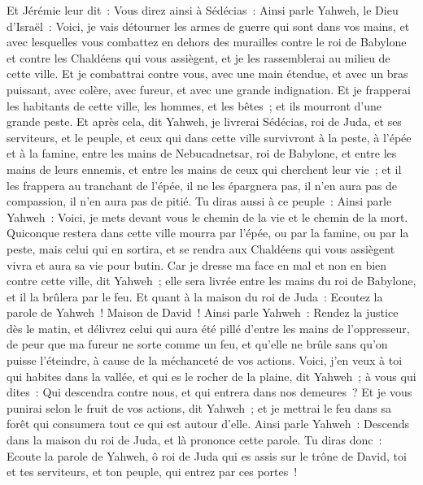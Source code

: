 \begin{multicols}{2}
Et Jérémie leur dit~: Vous direz ainsi à Sédécias~:
Ainsi parle Yahweh, le Dieu d'Israël~: Voici, je vais détourner les armes de guerre qui sont dans vos mains, et avec lesquelles vous combattez en dehors des murailles contre le roi de Babylone et contre les Chaldéens qui vous assiègent, et je les rassemblerai au milieu de cette ville.
Et je combattrai contre vous, avec une main étendue, et avec un bras puissant, avec colère, avec fureur, et avec une grande indignation.
Et je frapperai les habitants de cette ville, les hommes, et les bêtes~; et ils mourront d'une grande peste.
Et après cela, dit Yahweh, je livrerai Sédécias, roi de Juda, et ses serviteurs, et le peuple, et ceux qui dans cette ville survivront à la peste, à l'épée et à la famine, entre les mains de Nebucadnetsar, roi de Babylone, et entre les mains de leurs ennemis, et entre les mains de ceux qui cherchent leur vie~; et il les frappera au tranchant de l'épée, il ne les épargnera pas, il n'en aura pas de compassion, il n'en aura pas de pitié.
Tu diras aussi à ce peuple~: Ainsi parle Yahweh~: Voici, je mets devant vous le chemin de la vie et le chemin de la mort.
Quiconque restera dans cette ville mourra par l'épée, ou par la famine, ou par la peste, mais celui qui en sortira, et se rendra aux Chaldéens qui vous assiègent vivra et aura sa vie pour butin.
Car je dresse ma face en mal et non en bien contre cette ville, dit Yahweh~; elle sera livrée entre les mains du roi de Babylone, et il la brûlera par le feu.
Et quant à la maison du roi de Juda~: Ecoutez la parole de Yahweh~!
Maison de David~! Ainsi parle Yahweh~: Rendez la justice dès le matin, et délivrez celui qui aura été pillé d'entre les mains de l'oppresseur, de peur que ma fureur ne sorte comme un feu, et qu'elle ne brûle sans qu'on puisse l'éteindre, à cause de la méchanceté de vos actions.
Voici, j'en veux à toi qui habites dans la vallée, et qui es le rocher de la plaine, dit Yahweh~; à vous qui dites~: Qui descendra contre nous, et qui entrera dans nos demeures~?
Et je vous punirai selon le fruit de vos actions, dit Yahweh~; et je mettrai le feu dans sa forêt qui consumera tout ce qui est autour d'elle.
\VerseOne{}Ainsi parle Yahweh~: Descends dans la maison du roi de Juda, et là prononce cette parole.
Tu diras donc~: Ecoute la parole de Yahweh, ô roi de Juda qui es assis sur le trône de David, toi et tes serviteurs, et ton peuple, qui entrez par ces portes~!

\end{multicols}
